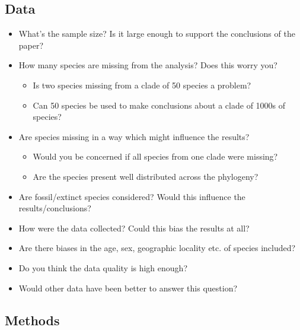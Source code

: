 \documentclass[]{book}
\providecommand{\tightlist}{%
  \setlength{\itemsep}{0pt}\setlength{\parskip}{0pt}}
\theoremstyle{definition}
\theoremstyle{definition}
\theoremstyle{definition}
\theoremstyle{remark}
\begin{document}
\subsection{Data}\label{data}

\begin{itemize}
\item
  What's the sample size? Is it large enough to support the conclusions
  of the paper?
\item
  How many species are missing from the analysis? Does this worry you?

  \begin{itemize}
  \tightlist
  \item
    Is two species missing from a clade of 50 species a problem?
  \item
    Can 50 species be used to make conclusions about a clade of 1000s of
    species?
  \end{itemize}
\item
  Are species missing in a way which might influence the results?

  \begin{itemize}
  \tightlist
  \item
    Would you be concerned if all species from one clade were missing?
  \item
    Are the species present well distributed across the phylogeny?
  \end{itemize}
\item
  Are fossil/extinct species considered? Would this influence the
  results/conclusions?
\item
  How were the data collected? Could this bias the results at all?
\item
  Are there biases in the age, sex, geographic locality etc. of species
  included?
\item
  Do you think the data quality is high enough?
\item
  Would other data have been better to answer this question?
\end{itemize}

\subsection{Methods}\label{methods}
\end{document}
